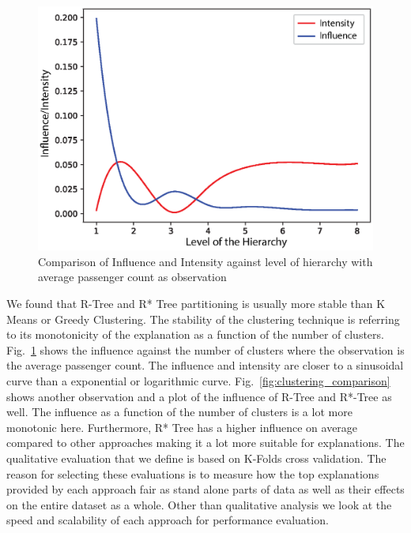 \begin{figure}[h]
\includegraphics[width=\columnwidth]{images/hieint_passenger_count}
\caption{Comparison of Influence and Intensity against level of hierarchy with average passenger count as observation}
\label{fig:hieint_passenger_count}
\end{figure}
We found that R-Tree and R* Tree partitioning is usually more stable than K Means or Greedy Clustering. The stability of the clustering technique is referring to its monotonicity of the explanation as a function of the number of clusters. Fig.~\ref{fig:hieint_passenger_count} shows the influence against the number of clusters where the observation is the average passenger count. The influence and intensity are closer to a sinusoidal curve than a exponential or logarithmic curve. Fig.~\ref{fig:clustering_comparison} shows another observation and a plot of the influence of R-Tree and R*-Tree as well. The influence as a function of the number of clusters is a lot more monotonic here. Furthermore, R* Tree has a higher influence on average compared to other approaches making it a lot more suitable for explanations.
The qualitative evaluation that we define is based on K-Folds cross validation. The reason for selecting these evaluations is to measure how the top explanations provided by each approach fair as stand alone parts of data as well as their effects on the entire dataset as a whole. Other than qualitative analysis we look at the speed and scalability of each approach for performance evaluation.




